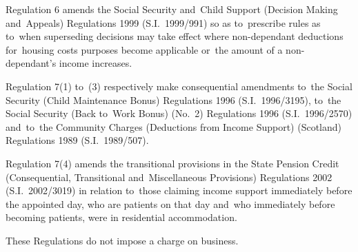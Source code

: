\documentclass[12pt,a4paper]{article}
\begin{document}
Regulation 6 amends the Social Security and~Child Support (Decision Making and~Appeals) Regulations 1999 (S.I.~1999/991) so as to~prescribe rules as to~when superseding decisions may take effect where non-dependant deductions for~housing costs purposes become applicable or~the amount of a non-dependant’s income increases.

Regulation 7(1) to~(3) respectively make consequential amendments to~the Social Security (Child Maintenance Bonus) Regulations 1996 (S.I.~1996/3195), to~the Social Security (Back to~Work Bonus) (No.~2) Regulations 1996 (S.I.~1996/2570) and~to~the Community Charges (Deductions from Income Support) (Scotland) Regulations 1989 (S.I.~1989/507).

Regulation 7(4) amends the transitional provisions in the State Pension Credit (Consequential, Transitional and~Miscellaneous Provisions) Regulations 2002 (S.I.~2002/3019) in relation to~those claiming income support immediately before the appointed day, who are patients on that day and~who immediately before becoming patients, were in residential accommodation.

These Regulations do not impose a charge on business. 
\end{document}
